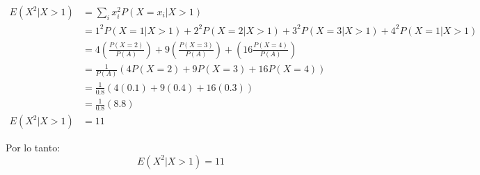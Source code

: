 \begin{align*}
    E(X^2|X>1) & = \sum_i x_i^2 P(X=x_i | X >1 )                                                                                   \\
               & = 1^2 P(X=1|X>1) + 2^2 P(X=2|X>1)+3^2P(X=3|X>1) +4^2 P(X=1|X>1)                                                   \\
               & = 4\left( \frac{P(X=2)}{P(A)} \right)+ 9 \left(\frac{P(X=3)}{P(A)}\right) + \left( 16 \frac{P(X=4)}{P(A)} \right) \\
               & = \frac{1}{P(A)} \left(4 P(X=2) + 9 P(X=3)+ 16 P(X=4) \right)                                                     \\
               & = \frac{1}{0.8} \left(4(0.1)+9(0.4)+16(0.3) \right)                                                               \\
               & = \frac{1}{0.8}\left(8.8\right)                                                                                   \\
    E(X^2|X>1) & = 11
\end{align*}

Por lo tanto:
\begin{equation*}
    E(X^2|X>1)  = 11
\end{equation*}